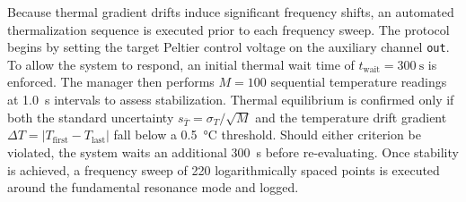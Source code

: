 Because thermal gradient drifts induce significant frequency shifts, an automated thermalization sequence is executed prior to each frequency sweep.
The protocol begins by setting the target Peltier control voltage on the auxiliary channel \texttt{out}.
To allow the system to respond, an initial thermal wait time of \( t_{\text{wait}} = \qty{300}{\second} \) is enforced.
The manager then performs \( M = 100 \) sequential temperature readings at \qty{1.0}{\second} intervals to assess stabilization.
Thermal equilibrium is confirmed only if both the standard uncertainty \( s_{\bar{T}} = \sigma_T/\sqrt{M} \) and the temperature drift gradient \( \Delta T = |T_{\text{first}} - T_{\text{last}}| \) fall below a \qty{0.5}{\degreeCelsius} threshold.
Should either criterion be violated, the system waits an additional \qty{300}{\second} before re-evaluating.
Once stability is achieved, a frequency sweep of 220 logarithmically spaced points is executed around the fundamental resonance mode and logged.
